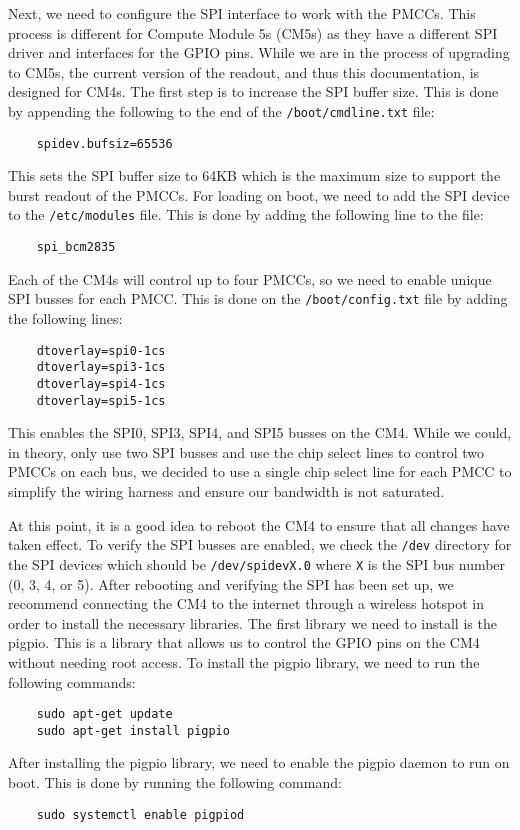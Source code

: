 Next, we need to configure the SPI interface to work with the PMCCs.
This process is different for Compute Module 5s (CM5s) as they have a different SPI driver and interfaces for the GPIO pins.
While we are in the process of upgrading to CM5s, the current version of the readout, and thus this documentation, is designed for CM4s.
The first step is to increase the SPI buffer size.
This is done by appending the following to the end of the \texttt{/boot/cmdline.txt} file:
\begin{verbatim}
    spidev.bufsiz=65536
\end{verbatim}
This sets the SPI buffer size to 64KB which is the maximum size to support the burst readout of the PMCCs.
For loading on boot, we need to add the SPI device to the \texttt{/etc/modules} file.
This is done by adding the following line to the file:
\begin{verbatim}
    spi_bcm2835
\end{verbatim}
Each of the CM4s will control up to four PMCCs, so we need to enable unique SPI busses for each PMCC.
This is done on the \texttt{/boot/config.txt} file by adding the following lines:
\begin{verbatim}
    dtoverlay=spi0-1cs
    dtoverlay=spi3-1cs
    dtoverlay=spi4-1cs
    dtoverlay=spi5-1cs
\end{verbatim}
This enables the SPI0, SPI3, SPI4, and SPI5 busses on the CM4.
While we could, in theory, only use two SPI busses and use the chip select lines to control two PMCCs on each bus, we decided to use a single chip select line for each PMCC to simplify the wiring harness and ensure our bandwidth is not saturated.

At this point, it is a good idea to reboot the CM4 to ensure that all changes have taken effect.
To verify the SPI busses are enabled, we check the \texttt{/dev} directory for the SPI devices which should be \texttt{/dev/spidevX.0} where \texttt{X} is the SPI bus number (0, 3, 4, or 5).
After rebooting and verifying the SPI has been set up, we recommend connecting the CM4 to the internet through a wireless hotspot in order to install the necessary libraries.
The first library we need to install is the pigpio.
This is a library that allows us to control the GPIO pins on the CM4 without needing root access.
To install the pigpio library, we need to run the following commands:
\begin{verbatim}
    sudo apt-get update
    sudo apt-get install pigpio
\end{verbatim}
After installing the pigpio library, we need to enable the pigpio daemon to run on boot.
This is done by running the following command:
\begin{verbatim}
    sudo systemctl enable pigpiod
\end{verbatim}

